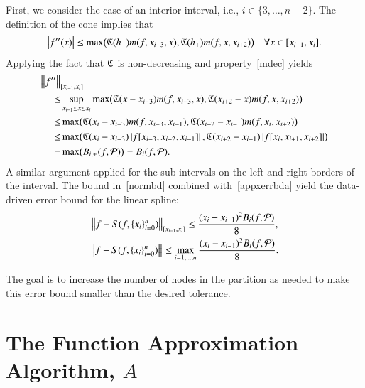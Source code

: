 \documentclass[review]{elsarticle}
\newcommand{\datasites}{\{x_i\}_{i=0}^n}
\theoremstyle{definition}
\begin{document}
First, we consider the case of an interior interval, i.e., $i \in \{3, \ldots, n-2\}$. The definition of the cone implies that
\begin{equation*}
\left \lvert f''(x) \right \rvert \le \max\bigl(\mathfrak{C}(h_-)m(f,x_{i-3},x),\mathfrak{C}(h_+)m(f,x,x_{i+2})\bigr)  \quad  \forall x \in [x_{i-1},x_i].
\end{equation*}
Applying the fact that $\mathfrak{C}$ is non-decreasing and property~\eqref{mdec} yields
\begin{align*}
\nonumber
\MoveEqLeft{\norm[{[x_{i-1},x_i]}]{f''}}\\
\nonumber
 \le  & \sup_{x_{i-1} \le x \le x_i} \max\bigl(\fC(x-x_{i-3})m(f,x_{i-3},x),\fC(x_{i+2}-x)m(f,x,x_{i+2})\bigr)  \\
\nonumber
 \le  &  \max\bigl(\fC(x_{i}-x_{i-3})m(f,x_{i-3},x_{i-1}),\fC(x_{i+2}-x_{i-1})m(f,x_i,x_{i+2})\bigr) \\
\nonumber  \le & \max\bigl(\fC(x_{i}-x_{i-3})\abs{f[x_{i-3},x_{i-2},x_{i-1}]},\bigr.
 \fC(x_{i+2}-x_{i-1})\abs{f[x_i,x_{i+1},x_{i+2}]}\bigr) \\
 =  & \max\bigl(B_{i,\pm}(f,\cp)\bigr) = B_i(f,\cp).
\end{align*}
A similar argument applied for the sub-intervals on the left and right borders of the interval.
The bound in~\eqref{normbd} combined with~\eqref{appxerrbda} yield the
data-driven error bound for the linear spline:
\begin{subequations} \label{appxerrbdb}
\begin{gather}
\norm[{[x_{i-1},x_i]}]{f - S(f,\datasites)} \le \frac{(x_i - x_{i-1})^2 B_{i}(f,\cp)}{8} , \\
\norm{f - S(f,\datasites)} \le
\max_{i=1, \ldots, n} \frac{(x_i - x_{i-1})^2 B_{i}(f,\cp)}{8} .
\end{gather}
\end{subequations}

The goal is to increase the number of nodes in the partition as needed to make
this error bound smaller than the desired tolerance.

\section{The Function Approximation Algorithm, $A$}\label{sec:fappx}
\end{document}

